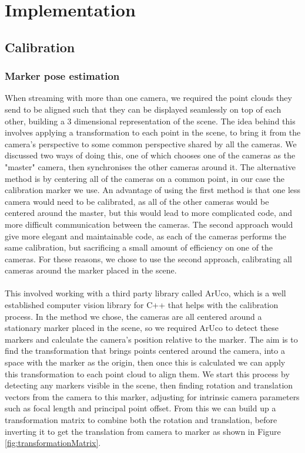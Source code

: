 \documentclass{article}
\begin{document}
\newpage
\section{Implementation}
\subsection{Calibration}
\subsubsection{Marker pose estimation}
When streaming with more than one camera, we required the point clouds they send to be aligned such that they can be displayed seamlessly on top of each other, building a 3 dimensional representation of the scene. The idea behind this involves applying a transformation to each point in the scene, to bring it from the camera's perspective to some common perspective shared by all the cameras. We discussed two ways of doing this, one of which chooses one of the cameras as the "master" camera, then synchronises the other cameras around it. The alternative method is by centering all of the cameras on a common point, in our case the calibration marker we use. An advantage of using the first method is that one less camera would need to be calibrated, as all of the other cameras would be centered around the master, but this would lead to more complicated code, and more difficult communication between the cameras. The second approach would give more elegant and maintainable code, as each of the cameras performs the same calibration, but sacrificing a small amount of efficiency on one of the cameras. For these reasons, we chose to use the second approach, calibrating all cameras around the marker placed in the scene.
\\\\
This involved working with a third party library called ArUco, which is a well established computer vision library for C++ that helps with the calibration process. In the method we chose, the cameras are all centered around a stationary marker placed in the scene, so we required ArUco to detect these markers and calculate the camera's position relative to the marker. The aim is to find the transformation that brings points centered around the camera, into a space with the marker as the origin, then once this is calculated we can apply this transformation to each point cloud to align them. We start this process by detecting any markers visible in the scene, then finding rotation and translation vectors from the camera to this marker, adjusting for intrinsic camera parameters such as focal length and principal point offset. From this we can build up a transformation matrix to combine both the rotation and translation, before inverting it to get the translation from camera to marker as shown in Figure \ref{fig:transformationMatrix}. \\
\end{document}
